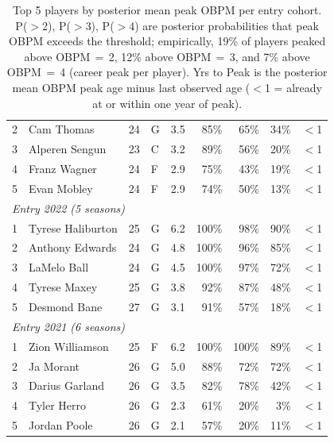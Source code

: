 \begin{table}[htbp]
\begin{tabular}{rlrlrrrrr}
    2 & Cam Thomas & 24 & G & 3.5 & 85\% & 65\% & 34\% & $<$1 \\
    3 & Alperen Sengun & 23 & C & 3.2 & 89\% & 56\% & 20\% & $<$1 \\
    4 & Franz Wagner & 24 & F & 2.9 & 75\% & 43\% & 19\% & $<$1 \\
    5 & Evan Mobley & 24 & F & 2.9 & 74\% & 50\% & 13\% & $<$1 \\
    \midrule[0.4pt]
    \multicolumn{9}{l}{\textit{Entry 2022 (5 seasons)}} \\
    \midrule
    1 & Tyrese Haliburton & 25 & G & 6.2 & 100\% & 98\% & 90\% & $<$1 \\
    2 & Anthony Edwards & 24 & G & 4.8 & 100\% & 96\% & 85\% & $<$1 \\
    3 & LaMelo Ball & 24 & G & 4.5 & 100\% & 97\% & 72\% & $<$1 \\
    4 & Tyrese Maxey & 25 & G & 3.8 & 92\% & 87\% & 48\% & $<$1 \\
    5 & Desmond Bane & 27 & G & 3.1 & 91\% & 57\% & 18\% & $<$1 \\
    \midrule[0.4pt]
    \multicolumn{9}{l}{\textit{Entry 2021 (6 seasons)}} \\
    \midrule
    1 & Zion Williamson & 25 & F & 6.2 & 100\% & 100\% & 89\% & $<$1 \\
    2 & Ja Morant & 26 & G & 5.0 & 88\% & 72\% & 72\% & $<$1 \\
    3 & Darius Garland & 26 & G & 3.5 & 82\% & 78\% & 42\% & $<$1 \\
    4 & Tyler Herro & 26 & G & 2.3 & 61\% & 20\% & 3\% & $<$1 \\
    5 & Jordan Poole & 26 & G & 2.1 & 57\% & 20\% & 11\% & $<$1 \\
    \bottomrule
  \end{tabular}
  \caption{Top 5 players by posterior mean peak OBPM per entry cohort. P($>$2), P($>$3), P($>$4) are posterior probabilities that peak OBPM exceeds the threshold; empirically, 19\% of players peaked above OBPM\,$=$\,2, 12\% above OBPM\,$=$\,3, and 7\% above OBPM\,$=$\,4 (career peak per player). Yrs to Peak is the posterior mean OBPM peak age minus last observed age ($<$1 = already at or within one year of peak).}
  \label{tab:breakout_cohort}
\end{table}

